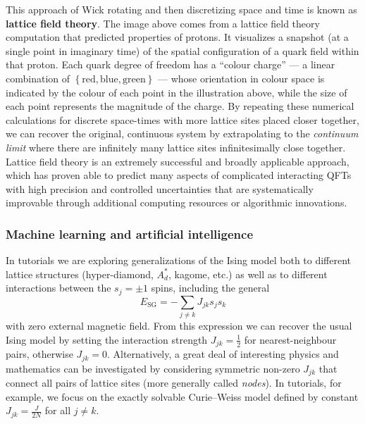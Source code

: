 This approach of Wick rotating and then discretizing space and time is known as \textbf{lattice field theory}.
The image above comes from a lattice field theory computation that predicted properties of protons.
It visualizes a snapshot (at a single point in imaginary time) of the spatial configuration of a quark field within that proton.
Each quark degree of freedom has a ``colour charge'' --- a linear combination of $\left\{\mbox{red}, \mbox{blue}, \mbox{green}\right\}$ --- whose orientation in colour space is indicated by the colour of each point in the illustration above, while the size of each point represents the magnitude of the charge.
By repeating these numerical calculations for discrete space-times with more lattice sites placed closer together, we can recover the original, continuous system by extrapolating to the  \textit{continuum limit} where there are infinitely many lattice sites infinitesimally close together.
Lattice field theory is an extremely successful and broadly applicable approach, which has proven able to predict many aspects of complicated interacting QFTs with high precision and controlled uncertainties that are systematically improvable through additional computing resources or algorithmic innovations.

\subsubsection*{Machine learning and artificial intelligence}
In tutorials we are exploring generalizations of the Ising model both to different lattice structures (hyper-diamond, $A_d^*$, kagome, etc.) as well as to different interactions between the $s_j = \pm 1$ spins, including the general
\begin{equation*}
  E_{\text{SG}} = -\sum_{j \neq k} J_{jk} s_j s_k
\end{equation*}
with zero external magnetic field.
From this expression we can recover the usual Ising model by setting the interaction strength $J_{jk} = \frac{1}{2}$ for nearest-neighbour pairs, otherwise $J_{jk} = 0$.
Alternatively, a great deal of interesting physics and mathematics can be investigated by considering symmetric non-zero $J_{jk}$ that connect all pairs of lattice sites (more generally called \textit{nodes}).
In tutorials, for example, we focus on the exactly solvable Curie--Weiss model defined by constant $J_{jk} = \frac{J}{2N}$ for all $j \neq k$.

